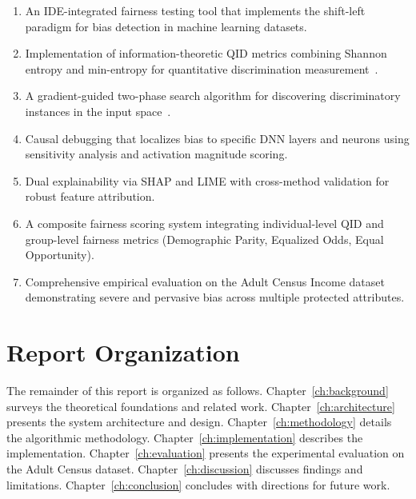 \begin{enumerate}[label=(\arabic*)]
    \item An IDE-integrated fairness testing tool that implements the shift-left paradigm for bias detection in machine learning datasets.
    \item Implementation of information-theoretic QID metrics combining Shannon entropy and min-entropy for quantitative discrimination measurement~\cite{dice}.
    \item A gradient-guided two-phase search algorithm for discovering discriminatory instances in the input space~\cite{dice, neufair}.
    \item Causal debugging that localizes bias to specific DNN layers and neurons using sensitivity analysis and activation magnitude scoring.
    \item Dual explainability via SHAP and LIME with cross-method validation for robust feature attribution.
    \item A composite fairness scoring system integrating individual-level QID and group-level fairness metrics (Demographic Parity, Equalized Odds, Equal Opportunity).
    \item Comprehensive empirical evaluation on the Adult Census Income dataset demonstrating severe and pervasive bias across multiple protected attributes.
\end{enumerate}

\section{Report Organization}

The remainder of this report is organized as follows. Chapter~\ref{ch:background} surveys the theoretical foundations and related work. Chapter~\ref{ch:architecture} presents the system architecture and design. Chapter~\ref{ch:methodology} details the algorithmic methodology. Chapter~\ref{ch:implementation} describes the implementation. Chapter~\ref{ch:evaluation} presents the experimental evaluation on the Adult Census dataset. Chapter~\ref{ch:discussion} discusses findings and limitations. Chapter~\ref{ch:conclusion} concludes with directions for future work.
